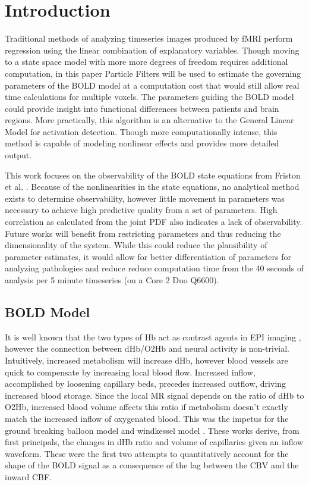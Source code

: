 \documentclass{article}
\begin{document}
\section{Introduction}
\label{sec:intro}
Traditional methods of analyzing timeseries images produced by 
\ac{fMRI} perform regression using the linear combination of explanatory variables. 
Though moving to a state space model with more more degrees of freedom 
requires additional computation, in this paper Particle Filters will
be used to estimate the governing parameters of the \ac{BOLD} model 
at a computation cost 
that would still allow real time calculations for multiple voxels.
The parameters guiding the BOLD model could provide insight into 
functional differences between patients and brain regions.
More practically, this algorithm is an alternative to the General
Linear Model for activation detection. Though more computationally intense,
this method is capable of modeling nonlinear effects
and provides more detailed output. 

This work focuses
on the observability of the \ac{BOLD} state equations from Friston et al.
\cite{Friston2000}. Because of the nonlinearities in the state equations,
no analytical method exists to determine observability, however little
movement in parameters was necessary to achieve high predictive quality from a
set of parameters. High correlation as calculated from the joint \ac{PDF}
also indicates a lack of observability.  Future works will benefit from
restricting parameters and thus reducing the dimensionality of the system.
While this could reduce the plausibility of parameter estimates, it would
allow for better differentiation of parameters for analyzing pathologies
and reduce reduce computation time from the 40 seconds of analysis
per 5 minute timeseries (on a Core 2 Duo Q6600).

\subsection{BOLD Model}
It is well known that the two types of \ac{Hb} act as contrast agents in 
\ac{EPI} imaging \cite{Buxton1998, WEISSKOFF1994, Ogawa}, however the connection
between \ac{dHb}/\ac{O2Hb} and neural activity is non-trivial. 
Intuitively, increased 
metabolism will increase \ac{dHb}, however blood vessels are quick
to compensate by increasing local blood flow. Increased inflow, accomplished by loosening 
capillary beds, precedes increased outflow, driving increased 
blood storage.
Since the local \ac{MR} signal depends on the ratio of \ac{dHb} to \ac{O2Hb},
increased blood volume affects this ratio if 
metabolism doesn't exactly match the increased inflow of oxygenated blood.
This was the impetus
for the ground breaking balloon model \cite{Buxton1998} and windkessel
model \cite{Mandeville1999}. These works derive, from first principals,
the changes in \ac{dHb} ratio and volume of capillaries given an inflow waveform.
These were the first two attempts to quantitatively account for the shape of the 
\ac{BOLD} signal as a consequence of the lag between the \ac{CBV}
and the inward \ac{CBF}. 
\end{document}

